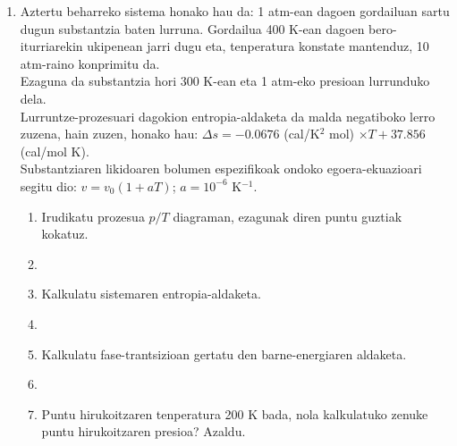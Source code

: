 \documentclass[10pt]{article}              %
\begin{document}
\begin{enumerate}
\item Aztertu beharreko sistema honako hau da: 1 atm-ean dagoen gordailuan sartu dugun substantzia baten lurruna. Gordailua 400 K-ean dagoen bero-iturriarekin ukipenean jarri dugu eta, tenperatura konstate mantenduz, 10 atm-raino konprimitu da.\\
    
    Ezaguna da substantzia hori 300 K-ean eta 1 atm-eko presioan lurrunduko dela.\\
    
    Lurruntze-prozesuari dagokion entropia-aldaketa da malda negatiboko lerro zuzena, hain zuzen, honako hau: $\Delta s=-0.0676$ (cal/K$^2$ mol) $\times T + 37.856$ (cal/mol K).\\
    
    Substantziaren likidoaren bolumen espezifikoak ondoko egoera-ekuazioari segitu dio: $v=v_{0}(1+aT)$; $a=10^{-6}$ K$^{-1}$.
    
\begin{enumerate} 
\item Irudikatu prozesua $p/T$ diagraman, ezagunak diren puntu guztiak kokatuz.
\item[]
\item Kalkulatu sistemaren entropia-aldaketa.
\item[]
\item Kalkulatu fase-trantsizioan gertatu den barne-energiaren aldaketa.
\item[]
\item Puntu hirukoitzaren tenperatura 200 K bada, nola kalkulatuko zenuke puntu hirukoitzaren presioa? Azaldu.
\end{enumerate}

\end{enumerate}
%



\end{document}
